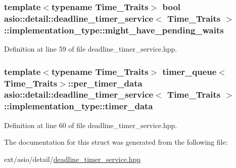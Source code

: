 \subsubsection[{might\+\_\+have\+\_\+pending\+\_\+waits}]{\setlength{\rightskip}{0pt plus 5cm}template$<$typename Time\+\_\+\+Traits$>$ bool {\bf asio\+::detail\+::deadline\+\_\+timer\+\_\+service}$<$ Time\+\_\+\+Traits $>$\+::implementation\+\_\+type\+::might\+\_\+have\+\_\+pending\+\_\+waits}\label{structasio_1_1detail_1_1deadline__timer__service_1_1implementation__type_aabd663b0730f0997fb20984dc01bccbf}


Definition at line 59 of file deadline\+\_\+timer\+\_\+service.\+hpp.

\hypertarget{structasio_1_1detail_1_1deadline__timer__service_1_1implementation__type_a5991f0ea08712c34c7bfe35559749ebe}{}
\subsubsection[{timer\+\_\+data}]{\setlength{\rightskip}{0pt plus 5cm}template$<$typename Time\+\_\+\+Traits$>$ {\bf timer\+\_\+queue}$<$Time\+\_\+\+Traits$>$\+::per\+\_\+timer\+\_\+data {\bf asio\+::detail\+::deadline\+\_\+timer\+\_\+service}$<$ Time\+\_\+\+Traits $>$\+::implementation\+\_\+type\+::timer\+\_\+data}\label{structasio_1_1detail_1_1deadline__timer__service_1_1implementation__type_a5991f0ea08712c34c7bfe35559749ebe}


Definition at line 60 of file deadline\+\_\+timer\+\_\+service.\+hpp.



The documentation for this struct was generated from the following file\+:\begin{DoxyCompactItemize}
\item 
ext/asio/detail/\hyperlink{detail_2deadline__timer__service_8hpp}{deadline\+\_\+timer\+\_\+service.\+hpp}\end{DoxyCompactItemize}
